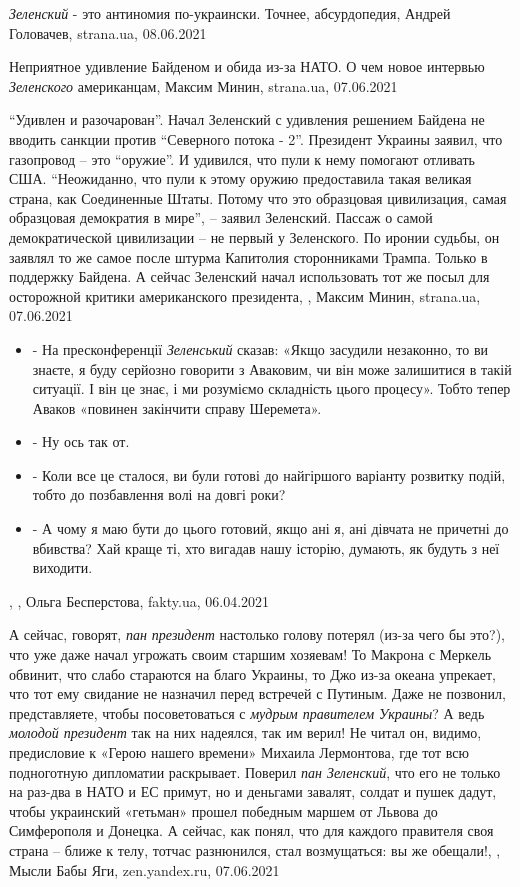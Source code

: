 \emph{Зеленский} - это антиномия по-украински. Точнее, абсурдопедия, Андрей Головачев, strana.ua, 08.06.2021

Неприятное удивление Байденом и обида из-за НАТО. О чем новое интервью \emph{Зеленского} американцам,
Максим Минин, strana.ua, 07.06.2021

\enquote{Удивлен и разочарован}.  Начал Зеленский с удивления решением Байдена
не вводить санкции против \enquote{Северного потока - 2}. Президент Украины
заявил, что газопровод – это \enquote{оружие}. И удивился, что пули к нему
помогают отливать США.  \enquote{Неожиданно, что пули к этому оружию
предоставила такая великая страна, как Соединенные Штаты. Потому что это
образцовая цивилизация, самая образцовая демократия в мире}, – заявил
Зеленский.  Пассаж о самой демократической цивилизации – не первый у
Зеленского. По иронии судьбы, он заявлял то же самое после штурма Капитолия
сторонниками Трампа. Только в поддержку Байдена. А сейчас Зеленский начал
использовать тот же посыл для осторожной критики американского президента,
, Максим Минин, strana.ua, 07.06.2021

\begin{itemize}
\item - На пресконференції \emph{Зеленський} сказав: «Якщо засудили незаконно,
то ви знаєте, я буду серйозно говорити з Аваковим, чи він може
залишитися в такій ситуації. І він це знає, і ми розуміємо
складність цього процесу». Тобто тепер Аваков «повинен
закінчити справу Шеремета».
\item - Ну ось так от.
\item - Коли все це сталося, ви були готові до найгіршого варіанту розвитку подій, тобто до позбавлення волі на довгі роки?
\item - А чому я маю бути до цього готовий, якщо ані я, ані дівчата не причетні до вбивства? Хай краще ті, хто вигадав нашу історію, думають, як будуть з неї виходити.
\end{itemize},
, 
Ольга Бесперстова, fakty.ua, 06.04.2021

А сейчас, говорят, \emph{пан президент} настолько голову потерял (из-за чего бы
это?), что уже даже начал угрожать своим старшим хозяевам! То Макрона с Меркель
обвинит, что слабо стараются на благо Украины, то Джо из-за океана упрекает,
что тот ему свидание не назначил перед встречей с Путиным. Даже не позвонил,
представляете, чтобы посоветоваться с \emph{мудрым правителем Украины}? А ведь
\emph{молодой президент} так на них надеялся, так им верил! Не читал он,
видимо, предисловие к «Герою нашего времени» Михаила Лермонтова, где тот всю
подноготную дипломатии раскрывает. Поверил \emph{пан Зеленский}, что его не
только на раз-два в НАТО и ЕС примут, но и деньгами завалят, солдат и пушек
дадут, чтобы украинский «гетьман» прошел победным маршем от Львова до
Симферополя и Донецка. А сейчас, как понял, что для каждого правителя своя
страна – ближе к телу, тотчас разнюнился, стал возмущаться: вы же обещали!,
, Мысли Бабы Яги, zen.yandex.ru, 07.06.2021


